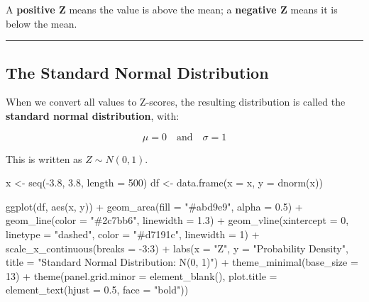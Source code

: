 \documentclass[
  12pt,
  letterpaper,
]{book}
\newenvironment{Shaded}{\begin{snugshade}}{\end{snugshade}}
\newcommand{\AttributeTok}[1]{\textcolor[rgb]{0.40,0.45,0.13}{#1}}
\newcommand{\DecValTok}[1]{\textcolor[rgb]{0.68,0.00,0.00}{#1}}
\newcommand{\FloatTok}[1]{\textcolor[rgb]{0.68,0.00,0.00}{#1}}
\newcommand{\FunctionTok}[1]{\textcolor[rgb]{0.28,0.35,0.67}{#1}}
\newcommand{\NormalTok}[1]{\textcolor[rgb]{0.00,0.23,0.31}{#1}}
\newcommand{\OtherTok}[1]{\textcolor[rgb]{0.00,0.23,0.31}{#1}}
\newcommand{\SpecialCharTok}[1]{\textcolor[rgb]{0.37,0.37,0.37}{#1}}
\newcommand{\StringTok}[1]{\textcolor[rgb]{0.13,0.47,0.30}{#1}}
\begin{document}
A \textbf{positive Z} means the value is above the mean; a
\textbf{negative Z} means it is below the mean.

\begin{center}\rule{0.5\linewidth}{0.5pt}\end{center}

\subsection{The Standard Normal
Distribution}\label{the-standard-normal-distribution}

When we convert all values to Z-scores, the resulting distribution is
called the \textbf{standard normal distribution}, with:

\[\mu = 0 \quad \text{and} \quad \sigma = 1\]

This is written as \(Z \sim N(0, 1)\).

\begin{Shaded}
\begin{Highlighting}[]
\NormalTok{x }\OtherTok{\textless{}{-}} \FunctionTok{seq}\NormalTok{(}\SpecialCharTok{{-}}\FloatTok{3.8}\NormalTok{, }\FloatTok{3.8}\NormalTok{, }\AttributeTok{length =} \DecValTok{500}\NormalTok{)}
\NormalTok{df }\OtherTok{\textless{}{-}} \FunctionTok{data.frame}\NormalTok{(}\AttributeTok{x =}\NormalTok{ x, }\AttributeTok{y =} \FunctionTok{dnorm}\NormalTok{(x))}

\FunctionTok{ggplot}\NormalTok{(df, }\FunctionTok{aes}\NormalTok{(x, y)) }\SpecialCharTok{+}
  \FunctionTok{geom\_area}\NormalTok{(}\AttributeTok{fill =} \StringTok{"\#abd9e9"}\NormalTok{, }\AttributeTok{alpha =} \FloatTok{0.5}\NormalTok{) }\SpecialCharTok{+}
  \FunctionTok{geom\_line}\NormalTok{(}\AttributeTok{color =} \StringTok{"\#2c7bb6"}\NormalTok{, }\AttributeTok{linewidth =} \FloatTok{1.3}\NormalTok{) }\SpecialCharTok{+}
  \FunctionTok{geom\_vline}\NormalTok{(}\AttributeTok{xintercept =} \DecValTok{0}\NormalTok{, }\AttributeTok{linetype =} \StringTok{"dashed"}\NormalTok{,}
             \AttributeTok{color =} \StringTok{"\#d7191c"}\NormalTok{, }\AttributeTok{linewidth =} \DecValTok{1}\NormalTok{) }\SpecialCharTok{+}
  \FunctionTok{scale\_x\_continuous}\NormalTok{(}\AttributeTok{breaks =} \SpecialCharTok{{-}}\DecValTok{3}\SpecialCharTok{:}\DecValTok{3}\NormalTok{) }\SpecialCharTok{+}
  \FunctionTok{labs}\NormalTok{(}\AttributeTok{x =} \StringTok{"Z"}\NormalTok{, }\AttributeTok{y =} \StringTok{"Probability Density"}\NormalTok{,}
       \AttributeTok{title =} \StringTok{"Standard Normal Distribution: N(0, 1)"}\NormalTok{) }\SpecialCharTok{+}
  \FunctionTok{theme\_minimal}\NormalTok{(}\AttributeTok{base\_size =} \DecValTok{13}\NormalTok{) }\SpecialCharTok{+}
  \FunctionTok{theme}\NormalTok{(}\AttributeTok{panel.grid.minor =} \FunctionTok{element\_blank}\NormalTok{(),}
        \AttributeTok{plot.title =} \FunctionTok{element\_text}\NormalTok{(}\AttributeTok{hjust =} \FloatTok{0.5}\NormalTok{, }\AttributeTok{face =} \StringTok{"bold"}\NormalTok{))}
\end{Highlighting}
\end{Shaded}
\end{document}
